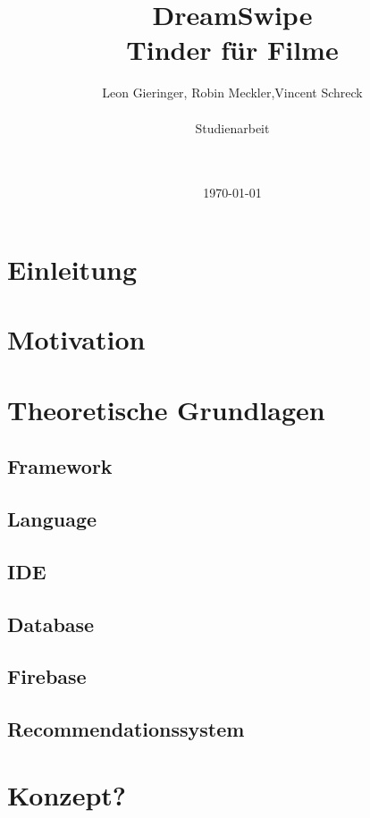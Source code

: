 \documentclass[11pt,a4paper]{article}
\title{DreamSwipe\\Tinder für Filme\vspace{10px}}
\author{Leon Gieringer, Robin Meckler,Vincent Schreck \\ \\ Studienarbeit \\ \\ \\}
\date{\today}
\begin{document}
\maketitle
\thispagestyle{empty}
\newpage
{}
\tableofcontents
\newpage
{}

\pagestyle{fancy}
\fancyhf{}
\setlength{\headheight}{35pt}
\cfoot{\thepage}
\newpage


\section{Einleitung}


\section{Motivation}


\section{Theoretische Grundlagen}


\subsection{Framework}

\subsection{Language}

\subsection{IDE}

\subsection{Database}

\subsection{Firebase}


\subsection{Recommendationssystem}
	
		
\section{Konzept?}

\end{document}
